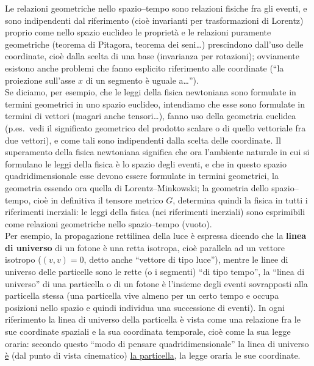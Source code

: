 Le relazioni geometriche nello spazio--tempo sono relazioni fisiche fra gli
eventi, e sono indipendenti dal riferimento (cio\`e invarianti per
trasformazioni di Lorentz) proprio come nello spazio euclideo le propriet\`a e
le relazioni puramente geometriche (teorema di Pitagora, teorema dei seni\dots)
prescindono dall'uso delle coordinate, cio\`e dalla scelta di una base
(invarianza per rotazioni); ovviamente esistono anche problemi che fanno
esplicito riferimento alle coordinate (``la proiezione sull'asse $x$ di un
segmento \`e uguale a\dots'').\\
Se diciamo, per esempio, che le leggi della fisica newtoniana sono formulate in
termini geometrici in uno spazio euclideo, intendiamo che esse sono formulate in
termini di vettori (magari anche tensori\dots), fanno uso della geometria
euclidea (p.es.\ vedi il significato geometrico del prodotto scalare o di quello
vettoriale fra due vettori), e come tali sono indipendenti dalla scelta delle
coordinate. Il superamento della fisica newtoniana significa che ora l'ambiente
naturale in cui si formulano le leggi della fisica \`e lo spazio degli eventi, e
che in questo spazio quadridimensionale esse devono essere formulate in termini
geometrici, la geometria essendo ora quella di Lorentz--Minkowski; la geometria
dello spazio--tempo, cio\`e in definitiva il tensore metrico $G$, determina
quindi la fisica in tutti i riferimenti inerziali: le leggi della fisica (nei
riferimenti inerziali) sono esprimibili come relazioni geometriche nello
spazio--tempo (vuoto).\\
Per esempio, la propagazione rettilinea della luce \`e espressa dicendo che la
\textbf{linea di universo} di un fotone \`e una retta isotropa, cio\`e parallela
ad un vettore isotropo \big($(v,v)=0$, detto anche ``vettore di tipo
luce''\big), mentre le linee di universo delle particelle sono le rette (o i
segmenti) ``di tipo tempo'', la ``linea di universo'' di una particella o di un
fotone \`e l'insieme degli eventi sovrapposti alla particella stessa (una
particella vive almeno per un certo tempo e occupa posizioni nello spazio e
quindi individua una successione di eventi). In ogni riferimento la linea di
universo della particella \`e vista come una relazione fra le sue coordinate
spaziali e la sua coordinata temporale, cio\`e come la sua legge oraria: secondo
questo ``modo di pensare quadridimensionale'' la linea di universo
\underline{\`e} (dal punto di vista cinematico) \underline{la particella}, la
legge oraria le sue coordinate.

